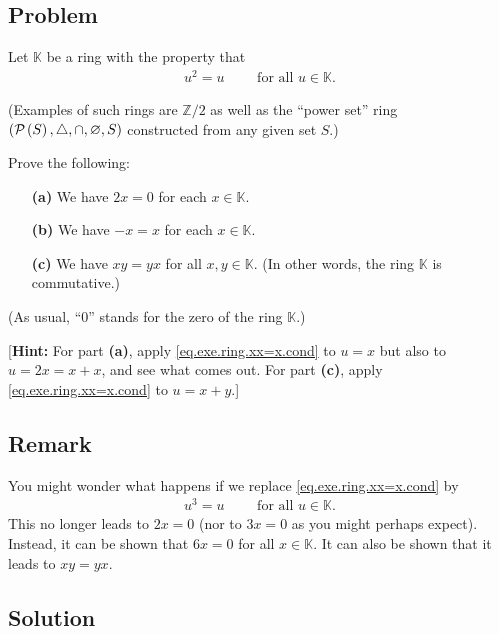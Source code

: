 \documentclass[paper=a4, fontsize=12pt]{scrartcl} %
\newcommand{\KK}{\mathbb{K}} %
\newcommand{\ZZ}{\mathbb{Z}} %
\newcommand{\tup}[1]{\left( #1 \right)}
\newcommand{\powset}[2][]{\ifthenelse{\equal{#2}{}}{\mathcal{P}\left(#1\right)}{\mathcal{P}_{#1}\left(#2\right)}}
\theoremstyle{plainsl}
\theoremstyle{definition}
\theoremstyle{remark}
\begin{document}
\subsection{Problem}

Let $\KK$ be a ring with the property that
\begin{align}
 u^2 = u \qquad \text{ for all } u \in \KK .
 \label{eq.exe.ring.xx=x.cond}
\end{align}

(Examples of such rings are $\ZZ / 2$ as well as the
``power set'' ring $\tup{\powset{S}, \triangle, \cap, \varnothing, S}$
constructed from any given set $S$.)

Prove the following:

\begin{enumerate}

\item[\textbf{(a)}]
We have $2x = 0$ for each $x \in \KK$.

\item[\textbf{(b)}]
We have $-x = x$ for each $x \in \KK$.

\item[\textbf{(c)}]
We have $xy = yx$ for all $x, y \in \KK$.
(In other words, the ring $\KK$ is commutative.)

\end{enumerate}

(As usual, ``$0$'' stands for the zero of the ring $\KK$.)

[\textbf{Hint:}
For part \textbf{(a)},
apply \eqref{eq.exe.ring.xx=x.cond} to $u = x$
but also to $u = 2x = x + x$, and see what comes out.
For part \textbf{(c)},
apply \eqref{eq.exe.ring.xx=x.cond} to $u = x + y$.]

\subsection{Remark}

You might wonder what happens if we replace
\eqref{eq.exe.ring.xx=x.cond} by
\begin{align}
 u^3 = u \qquad \text{ for all } u \in \KK .
 \label{eq.exe.ring.xx=x.cube}
\end{align}
This no longer leads to $2x = 0$ (nor to $3x = 0$ as you
might perhaps expect).
Instead, it can be shown that $6x = 0$ for all $x \in \KK$.
It can also be shown that it leads to $xy = yx$.

\subsection{Solution}
\end{document}
